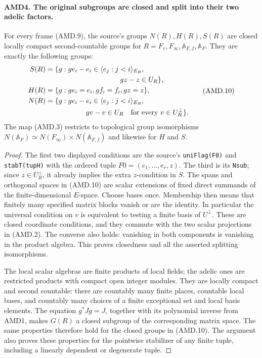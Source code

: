 \paragraph{AMD4. The original subgroups are closed and split into their two adelic factors.}
\label{claim:AMD4}
For every frame (AMD.9), the source's groups \(N(R),H(R),S(R)\)
are closed locally compact second-countable groups for
\(R=F_v,F_\infty,\mathbb A_{F,f},\mathbb A_F\).  They are
exactly the following groups:
\[
\begin{split}
 S(R)&=\{g:ge_i-e_i\in\langle e_j:j<i\rangle_{E_R},\\
       &\hspace{37mm}gz-z\in U_R\},\\
 H(R)&=\{g:ge_i=e_i, gf_i=f_i, gz=z\},\\
 N(R)&=\{g:ge_i-e_i\in\langle e_j:j<i\rangle_{E_R},\\
       &\hspace{20mm}gv-v\in U_R\quad\hbox{for every }v\in U_R^\perp\}.
\end{split}
 \tag{AMD.10}
\]
The map (AMD.3) restricts to topological group isomorphisms
\(N(\mathbb A_F)\simeq N(F_\infty)\times N(\mathbb A_{F,f})\)
and likewise for \(H\) and \(S\).

\begin{proof}
The first two displayed conditions are the source's
\texttt{uniFlag(F0)} and \texttt{stabT(tupH)} with the ordered
tuple \(F0=(e_1,\ldots,e_r,z)\).  The third is its
\texttt{Nsub}; since \(z\in U_R^\perp\), it already implies
the extra \(z\)-condition in \(S\).  The spans and orthogonal
spaces in (AMD.10) are scalar extensions of fixed direct
summands of the finite-dimensional \(E\)-space.  Choose bases
once.  Membership then means that finitely many specified matrix
blocks vanish or are the identity.  In particular the universal
condition on \(v\) is equivalent to testing a finite basis of
\(U^\perp\).  These are closed coordinate conditions, and
they commute with the two scalar projections in (AMD.2).
The converse also holds: vanishing in both components is
vanishing in the product algebra.  This proves closedness and
all the asserted splitting isomorphisms.

The local scalar algebras are finite products of local fields;
the adelic ones are restricted products with compact open
integer modules.  They are locally compact and second countable:
there are countably many finite places, countable local bases,
and countably many choices of a finite exceptional set and local
basis elements.  The equation \(g^*Jg=J\), together with its
polynomial inverse from AMD1, makes \(G(R)\) a closed subgroup
of the corresponding matrix space.  The same properties therefore
hold for the closed groups in (AMD.10).  The argument also proves
these properties for the pointwise stabilizer of any finite
tuple, including a linearly dependent or degenerate tuple.
\end{proof}

